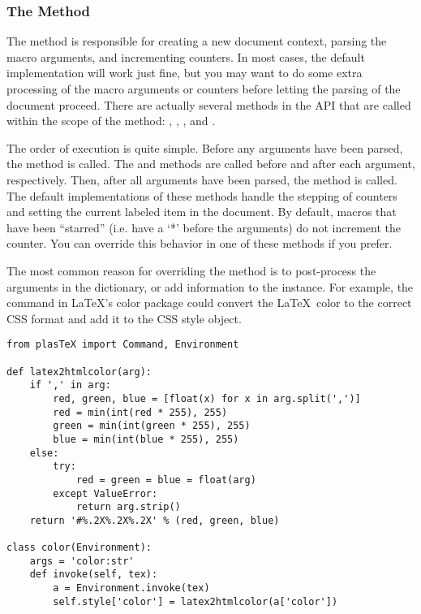 \subsubsection{The  Method}

The  method is responsible for creating a new document
context, parsing the macro arguments, and incrementing counters.
In most cases, the default implementation will work just fine, but you
may want to do some extra processing of the macro arguments or
counters before letting the parsing of the document proceed.  There
are actually several methods in the API that are called within the
scope of the  method: , ,
, and .

The order of execution is quite simple.  Before any arguments have been
parsed, the  method is called.  The 
and  methods are called before and after each
argument, respectively.  Then, after all arguments have been parsed, the
 method is called.  The default implementations of
these methods handle the stepping of counters and setting the
current labeled item in the document.  By default, macros that have
been ``starred'' (i.e. have a `*' before the arguments) do not
increment the counter.  You can override this behavior in one of these
methods if you prefer.

The most common reason for overriding the  method is to
post-process the arguments in the  dictionary, or
add information to the instance.
For example, the  command in \LaTeX's color package
could convert the \LaTeX\ color to the correct CSS format
and add it to the CSS style object.
\begin{verbatim}
from plasTeX import Command, Environment

def latex2htmlcolor(arg):
    if ',' in arg:
        red, green, blue = [float(x) for x in arg.split(',')]
        red = min(int(red * 255), 255)
        green = min(int(green * 255), 255)
        blue = min(int(blue * 255), 255)
    else:
        try:
            red = green = blue = float(arg)
        except ValueError:
            return arg.strip()
    return '#%.2X%.2X%.2X' % (red, green, blue)

class color(Environment):
    args = 'color:str'
    def invoke(self, tex):
        a = Environment.invoke(tex)
        self.style['color'] = latex2htmlcolor(a['color'])
\end{verbatim}

